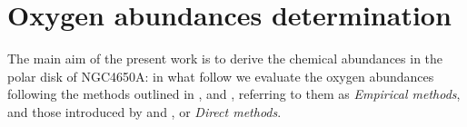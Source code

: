 \documentclass[12pt,preprint]{aastex}
\begin{document}





\section{Oxygen abundances determination}\label{met}


The main aim of the present work is to derive the chemical abundances
in the polar disk of NGC4650A: in what follow we evaluate the oxygen
abundances following the methods outlined in \citet{Pag79},
\citet{Diaz00} and \citet{Pil01}, referring to them as \emph{Empirical
  methods}, and those introduced by \citet{Ost89} and \citet{All84},
or \emph{Direct methods}.
\end{document}
